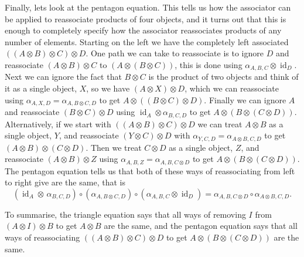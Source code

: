 \documentclass[fleqn]{NotesClass}
\DeclareMathOperator{\id}{id}
\begin{document}
    Finally, lets look at the pentagon equation.
    This tells us how the associator can be applied to reassociate products of four objects, and it turns out that this is enough to completely specify how the associator reassociates products of any number of elements.
    Starting on the left we have the completely left associated \(((A \otimes B) \otimes C) \otimes D\).
    One path we can take to reassociate is to ignore \(D\) and reassociate \((A \otimes B) \otimes C\) to \((A \otimes (B \otimes C))\), this is done using \(\alpha_{A, B, C} \otimes \id_D\).
    Next we can ignore the fact that \(B \otimes C\) is the product of two objects and think of it as a single object, \(X\), so we have \((A \otimes X) \otimes D\), which we can reassociate using \(\alpha_{A, X, D} = \alpha_{A, B \otimes C, D}\) to get \(A \otimes ((B \otimes C) \otimes D)\).
    Finally we can ignore \(A\) and reassociate \((B \otimes C) \otimes D\) using \({\id_A} \otimes \alpha_{B, C, D}\) to get \(A \otimes (B \otimes (C \otimes D))\).
    Alternatively, if we start with \(((A \otimes B) \otimes C) \otimes D\) we can treat \(A \otimes B\) as a single object, \(Y\), and reassociate \((Y \otimes C) \otimes D\) with \(\alpha_{Y, C, D} = \alpha_{A \otimes B, C, D}\) to get \((A \otimes B) \otimes (C \otimes D)\).
    Then we treat \(C \otimes D\) as a single object, \(Z\), and reassociate \((A \otimes B) \otimes Z\) using \(\alpha_{A, B, Z} = \alpha_{A, B, C \otimes D}\) to get \(A \otimes (B \otimes (C \otimes D))\).
    The pentagon equation tells us that both of these ways of reassociating from left to right give are the same, that is
    \begin{equation}
        ({\id_A} \otimes \, \alpha_{B, C, D}) \circ (\alpha_{A, B \otimes C, D}) \circ (\alpha_{A, B, C} \otimes \id_D) = \alpha_{A, B, C\otimes D} \circ \alpha_{A\otimes B, C, D}.
    \end{equation}
    
    To summarise, the triangle equation says that all ways of removing \(I\) from \((A \otimes I) \otimes B\) to get \(A \otimes B\) are the same, and the pentagon equation says that all ways of reassociating \(((A \otimes B) \otimes C) \otimes D\) to get \(A \otimes (B \otimes (C \otimes D))\) are the same.
    
\end{document}

